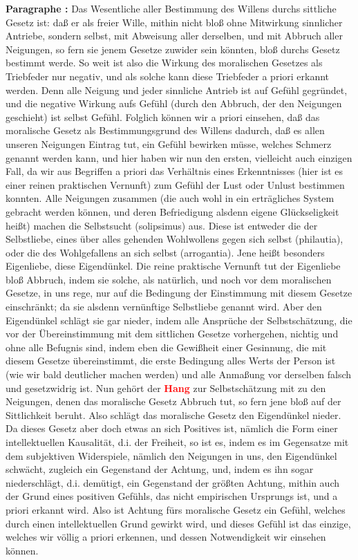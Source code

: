 \documentclass[a4paper,12pt,twoside]{book}
\newcommand{\match}[1]{\textcolor{red}{\textbf{#1}}}
\begin{document}
	\noindent\textbf{Paragraphe : }Das Wesentliche aller Bestimmung des Willens durchs sittliche Gesetz ist: daß er als freier Wille, mithin nicht bloß ohne Mitwirkung sinnlicher Antriebe, sondern selbst, mit Abweisung aller derselben, und mit Abbruch aller Neigungen, so fern sie jenem Gesetze zuwider sein könnten, bloß durchs Gesetz bestimmt werde. So weit ist also die Wirkung des moralischen Gesetzes als Triebfeder nur negativ, und als solche kann diese Triebfeder a priori erkannt werden. Denn alle Neigung und jeder sinnliche Antrieb ist auf Gefühl gegründet, und die negative Wirkung aufs Gefühl (durch den Abbruch, der den Neigungen geschieht) ist selbst Gefühl. Folglich können wir a priori einsehen, daß das moralische  Gesetz als Bestimmungsgrund des Willens dadurch, daß es allen unseren Neigungen Eintrag tut, ein Gefühl bewirken müsse, welches Schmerz genannt werden kann, und hier haben wir nun den ersten, vielleicht auch einzigen Fall, da wir aus Begriffen a priori das Verhältnis eines Erkenntnisses (hier ist es einer reinen praktischen Vernunft) zum Gefühl der Lust oder Unlust bestimmen konnten. Alle Neigungen zusammen (die auch wohl in ein erträgliches System gebracht werden können, und deren Befriedigung alsdenn eigene Glückseligkeit heißt) machen die Selbstsucht (solipsimus) aus. Diese ist entweder die der Selbstliebe, eines über alles gehenden Wohlwollens gegen sich selbst (philautia), oder die des Wohlgefallens an sich selbst (arrogantia). Jene heißt besonders Eigenliebe, diese Eigendünkel. Die reine praktische Vernunft tut der Eigenliebe bloß Abbruch, indem sie solche, als natürlich, und noch vor dem moralischen Gesetze, in uns rege, nur auf die Bedingung der Einstimmung mit diesem Gesetze einschränkt; da sie alsdenn vernünftige Selbstliebe genannt wird. Aber den Eigendünkel schlägt sie gar nieder, indem alle Ansprüche der Selbstschätzung, die vor der Übereinstimmung mit dem sittlichen Gesetze vorhergehen, nichtig und ohne alle Befugnis sind, indem eben die Gewißheit einer Gesinnung, die mit diesem Gesetze übereinstimmt, die erste Bedingung alles Werts der Person ist (wie wir bald deutlicher machen werden) und alle Anmaßung vor derselben falsch und gesetzwidrig ist. Nun gehört der \match{Hang} zur Selbstschätzung mit zu den Neigungen, denen das moralische Gesetz Abbruch tut, so fern jene bloß auf der Sittlichkeit beruht. Also schlägt das moralische Gesetz den Eigendünkel nieder. Da dieses Gesetz aber doch etwas an sich Positives ist, nämlich die Form einer intellektuellen Kausalität, d.i. der Freiheit, so ist es, indem es im Gegensatze mit dem subjektiven Widerspiele, nämlich den Neigungen in uns, den Eigendünkel schwächt, zugleich ein Gegenstand der Achtung, und, indem es ihn sogar niederschlägt, d.i. demütigt, ein Gegenstand der größten Achtung, mithin  auch der Grund eines positiven Gefühls, das nicht empirischen Ursprungs ist, und a priori erkannt wird. Also ist Achtung fürs moralische Gesetz ein Gefühl, welches durch einen intellektuellen Grund gewirkt wird, und dieses Gefühl ist das einzige, welches wir völlig a priori erkennen, und dessen Notwendigkeit wir einsehen können. 
	
\end{document}
